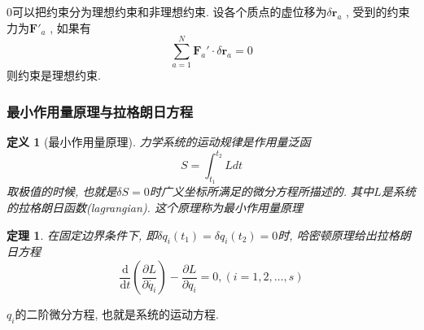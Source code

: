\documentclass[a4paper,11pt]{book}
\newtheorem{definition}{\hspace{2em}定义}[section]
\newtheorem{theorem}{\hspace{2em}定理}[section]
\begin{document}
$0$可以把约束分为理想约束和非理想约束. 设各个质点的虚位移为$\delta\mathbf{r}_a$ , 受到的约束力为$\mathbf{F'}_a$ , 如果有
\begin{equation*}
  \sum_{a=1}^{N}\mathbf{F}_a'\cdot\delta\mathbf{r}_a=0
\end{equation*}
则约束是理想约束.
\subsubsection*{最小作用量原理与拉格朗日方程}\label{Least Action section}
\begin{definition}[最小作用量原理]
  力学系统的运动规律是作用量泛函
\begin{equation*}
  S=\int_{t_1}^{t_2}Ldt
\end{equation*}
取极值的时候, 也就是$\delta S=0$时广义坐标所满足的微分方程所描述的. 其中$L$是系统的拉格朗日函数(lagrangian). 这个原理称为最小作用量原理
\end{definition}
\begin{theorem}
  在固定边界条件下, 即$\delta q_i(t_1)=\delta q_i(t_2)=0$时, 哈密顿原理给出拉格朗日方程
  \begin{equation*}
    \frac{\mathrm{d}}{\mathrm{d}t}(\frac{\partial {L}}{\partial{\dot{q_i}}})-\frac{\partial{L}}{\partial{q_i}}=0,(i=1,2,\dots,s)
  \end{equation*}
\end{theorem}
$q_i$的二阶微分方程, 也就是系统的运动方程.
\end{document}
